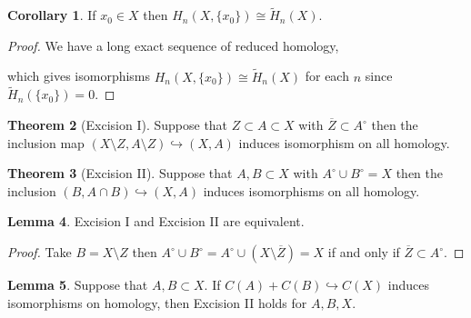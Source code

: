 \documentclass[12pt]{extarticle}
\theoremstyle{definition}
\newtheorem{theorem}{Theorem}[section]
\newtheorem{lemma}[theorem]{Lemma}
\newtheorem{corollary}[theorem]{Corollary}
\newcommand{\hook}{\hookrightarrow}
\begin{document}
\begin{corollary}
If $x_0 \in X$ then $H_n(X, \{x_0\}) \cong \tilde{H}_n(X)$.
\end{corollary}

\begin{proof}
We have a long exact sequence of reduced homology,
\begin{center}
\end{center} 
which gives isomorphisms $H_n(X, \{x_0\}) \cong \tilde{H}_n(X)$ for each $n$ since $\tilde{H}_n(\{x_0\}) = 0$.
\end{proof}

\begin{theorem}[Excision I]
Suppose that $Z \subset A \subset X$ with $\overline{Z} \subset A^\circ$ then the inclusion map $(X \setminus Z, A \setminus Z) \hook (X, A)$ induces isomorphism on all homology.
\end{theorem}

\begin{theorem}[Excision II]
Suppose that $A, B \subset X$ with $A^\circ \cup B^\circ = X$ then the inclusion $(B, A \cap B) \hook (X, A)$ induces isomorphisms on all homology. 
\end{theorem}

\begin{lemma}
Excision I and Excision II are equivalent. 
\end{lemma}

\begin{proof}
Take $B = X \setminus Z$ then $A^\circ \cup B^\circ = A^\circ \cup (X \setminus \overline{Z}) = X$ if and only if $\overline{Z} \subset A^\circ$.  
\end{proof}

\begin{lemma}
Suppose that $A, B \subset X$. If $C(A) + C(B) \hook C(X)$ induces isomorphisms on homology, then Excision II holds for $A,B, X$.
\end{lemma}
\end{document}
